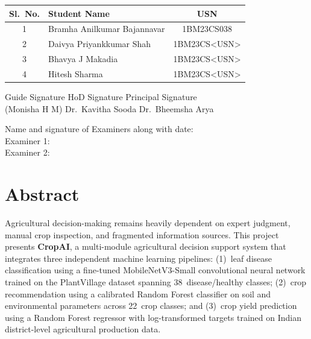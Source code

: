 \documentclass[12pt,a4paper]{report}
\begin{document}
\begin{center}
\renewcommand{\arraystretch}{1.3}
\begin{tabular}{|c|l|c|}
\hline
\textbf{Sl.~No.} & \textbf{Student Name} & \textbf{USN} \\
\hline
1 & Bramha Anilkumar Bajannavar & 1BM23CS038 \\
\hline
2 & Daivya Priyankkumar Shah & 1BM23CS\textless USN\textgreater \\
\hline
3 & Bhavya J Makadia & 1BM23CS\textless USN\textgreater \\
\hline
4 & Hitesh Sharma & 1BM23CS\textless USN\textgreater \\
\hline
\end{tabular}
\end{center}

\vspace{2cm}
\begin{flushleft}
Guide Signature \hspace{28mm} HoD Signature \hspace{22mm} Principal Signature\\
(Monisha H M) \hspace{30mm} Dr.~Kavitha Sooda \hspace{14mm} Dr.~Bheemsha Arya
\end{flushleft}
\vspace{2cm}
\begin{flushleft}
Name and signature of Examiners along with date:\\[0.8cm]
Examiner 1:\\[0.8cm]
Examiner 2:\\
\end{flushleft}

\chapter*{Abstract}
\thispagestyle{empty}

Agricultural decision-making remains heavily dependent on expert judgment, manual crop inspection, and fragmented information sources. This project presents \textbf{CropAI}, a multi-module agricultural decision support system that integrates three independent machine learning pipelines: (1)~leaf disease classification using a fine-tuned MobileNetV3-Small convolutional neural network trained on the PlantVillage dataset spanning 38~disease/healthy classes; (2)~crop recommendation using a calibrated Random Forest classifier on soil and environmental parameters across 22~crop classes; and (3)~crop yield prediction using a Random Forest regressor with log-transformed targets trained on Indian district-level agricultural production data.
\end{document}
